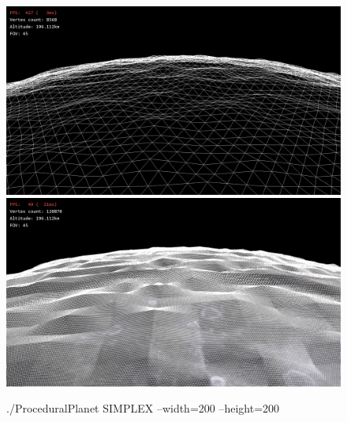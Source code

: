 \begin{center}
\begin{figure}
    \centering
    \includegraphics[width=13cm]{img/SIMPLEX_w200_h200_wire_0.png}
    \includegraphics[width=13cm]{img/SIMPLEX_w200_h200_wire_1.png}
    \caption{./ProceduralPlanet SIMPLEX --width=200 --height=200}
    \label{fig:simplex_200}
\end{figure}

\end{center}

\newpage
